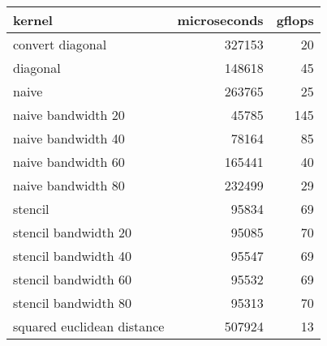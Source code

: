 \begin{tabular}{lrr}
\toprule
                    kernel &  microseconds &  gflops \\
\midrule
          convert diagonal &        327153 &      20 \\
                  diagonal &        148618 &      45 \\
                     naive &        263765 &      25 \\
        naive bandwidth 20 &         45785 &     145 \\
        naive bandwidth 40 &         78164 &      85 \\
        naive bandwidth 60 &        165441 &      40 \\
        naive bandwidth 80 &        232499 &      29 \\
                   stencil &         95834 &      69 \\
      stencil bandwidth 20 &         95085 &      70 \\
      stencil bandwidth 40 &         95547 &      69 \\
      stencil bandwidth 60 &         95532 &      69 \\
      stencil bandwidth 80 &         95313 &      70 \\
squared euclidean distance &        507924 &      13 \\
\bottomrule
\end{tabular}
